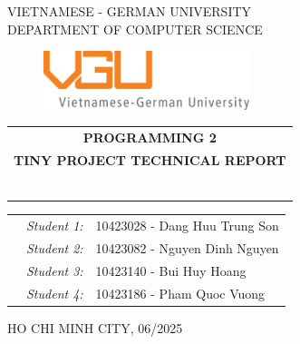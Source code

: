 \documentclass[11pt]{report}
\theoremstyle{mytheor}
\begin{document}
\begin{titlepage}
\begin{center}
VIETNAMESE - GERMAN UNIVERSITY \\
DEPARTMENT OF COMPUTER SCIENCE
\end{center}

\vspace{1cm}

\begin{figure}[h!]
\begin{center}
\includegraphics[width=6cm]{assets/vgu_logo_large.png}
\end{center}
\end{figure}

\vspace{2cm}

\begin{center}
\begin{tabular}{c}
\multicolumn{1}{c}{\textbf{{\Large PROGRAMMING 2}}} \\ 
\multicolumn{1}{c}{\textbf{{\Large TINY PROJECT TECHNICAL REPORT}}}

~~\\

\\
\multicolumn{1}{l}{\textbf{{\Large}}}\\
\\
\textbf{{\Large}}\\

\\
\\

\end{tabular}
\end{center}

\vspace{3cm}

\begin{table}[h]
\centering
\begin{tabular}{rrl}
&\textit{Student 1:} & 10423028 - Dang Huu Trung Son \\
&\textit{Student 2:} & 10423082 - Nguyen Dinh Nguyen \\
&\textit{Student 3:} & 10423140 - Bui Huy Hoang \\
&\textit{Student 4:} & 10423186 - Pham Quoc Vuong \\
\end{tabular}
\end{table}

\vspace{3cm}

\begin{center}
{\footnotesize HO CHI MINH CITY, 06/2025}
\end{center}

\end{titlepage}

\renewcommand{\contentsname}{Content}
\newpage
\vspace{1cm}
\tableofcontents

\newpage


\newpage


\newpage


\newpage


\newpage

\end{document}
